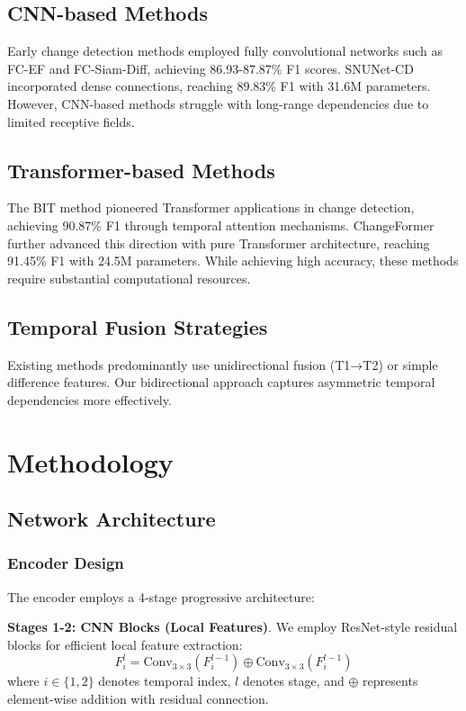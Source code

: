 \documentclass[journal]{IEEEtran}
\begin{document}
\subsection{CNN-based Methods}

Early change detection methods employed fully convolutional networks such as FC-EF and FC-Siam-Diff, achieving 86.93-87.87\% F1 scores. SNUNet-CD incorporated dense connections, reaching 89.83\% F1 with 31.6M parameters. However, CNN-based methods struggle with long-range dependencies due to limited receptive fields.

\subsection{Transformer-based Methods}

The BIT method pioneered Transformer applications in change detection, achieving 90.87\% F1 through temporal attention mechanisms. ChangeFormer further advanced this direction with pure Transformer architecture, reaching 91.45\% F1 with 24.5M parameters. While achieving high accuracy, these methods require substantial computational resources.

\subsection{Temporal Fusion Strategies}

Existing methods predominantly use unidirectional fusion (T1→T2) or simple difference features. Our bidirectional approach captures asymmetric temporal dependencies more effectively.

\section{Methodology}

\subsection{Network Architecture}

\subsubsection{Encoder Design}

The encoder employs a 4-stage progressive architecture:

\textbf{Stages 1-2: CNN Blocks (Local Features)}. We employ ResNet-style residual blocks for efficient local feature extraction:
\begin{equation}
F_i^l = \text{Conv}_{3\times 3}(F_i^{l-1}) \oplus \text{Conv}_{3\times 3}(F_i^{l-1})
\end{equation}
where $i \in \{1,2\}$ denotes temporal index, $l$ denotes stage, and $\oplus$ represents element-wise addition with residual connection.
\end{document}
